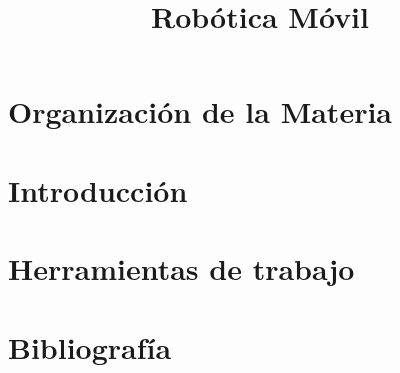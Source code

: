 \documentclass[aspectratio=169,compress]{beamer}
\title{Robótica Móvil}
\author{}
\institute{Universidad Nacional de Rosario}
\date{}
\begin{document}
\frame{\titlepage}

\section{Organización de la Materia}


\section{Introducción}


\section{Herramientas de trabajo}


\section{Bibliografía}

\end{document}
